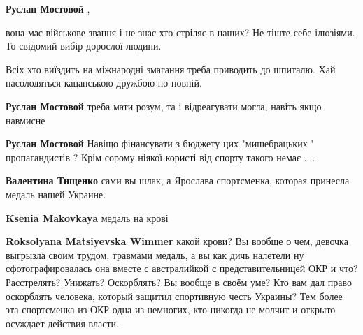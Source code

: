 \begin{itemize}
\begin{itemize}
\begin{itemize}
\textbf{Руслан Мостовой} , 

вона має військове звання і не знає хто стріляє в наших? Не тіште себе
ілюзіями. То свідомий вибір дорослої людини.

Всіх хто виїздить на міжнародні змагання треба приводить до шпиталю. Хай
насолодяться кацапською дружбою по-повній.

 
\textbf{Руслан Мостовой} треба мати розум, та і відреагувати могла, навіть якщо навмисне

 
\textbf{Руслан Мостовой} Навіщо фінансувати з бюджету цих "мишебрацьких " пропагандистів ? Крім сорому ніякої користі від спорту такого немає ....
\end{itemize}

 
\textbf{Валентина Тищенко} сами вы шлак, а Ярослава спортсменка, которая принесла медаль нашей Украине.

\begin{itemize}
 
\textbf{Ksenia Makovkaya} медаль на крові

 
\textbf{Roksolyana Matsiyevska Wimmer} какой крови? Вы вообще о чем, девочка
выгрызла своим трудом, травмами медаль, а вы как дичь налетели ну
сфотографировалась она вместе с австралийкой с представительницей ОКР и что?
Расстрелять? Унижать? Оскорблять? Вы вообще в своём уме? Кто вам дал право
оскорблять человека, который защитил спортивную честь Украины? Тем более эта
спортсменка из ОКР одна из немногих, кто никогда не молчит и открыто осуждает
действия власти.


\end{itemize}
\end{itemize}
\end{itemize}
